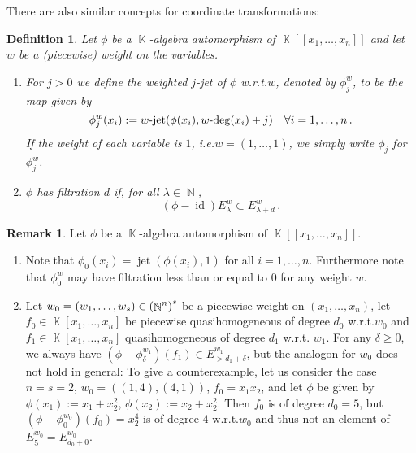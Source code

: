 \documentclass{amsproc}
\newtheorem{defn}[theorem]{Definition}
\theoremstyle{definition}
\newtheorem{remark}[theorem]{Remark}
\let\originalleft\left
\let\originalright\right
\renewcommand{\left}{\mathopen{}\mathclose\bgroup\originalleft}
\renewcommand{\right}{\aftergroup\egroup\originalright}
\DeclareMathOperator{\jet}{jet}
\DeclareMathOperator{\N}{\mathbb{N}}
\DeclareMathOperator{\K}{\mathbb{K}}
\DeclareMathOperator{\id}{id}
\DeclareMathOperator{\dash}{\!\textnormal{-}\!}
\begin{document}
There are also similar concepts for coordinate transformations:

\begin{defn}\label{def:jet_phi}
Let $\phi$ be a $\K$-algebra automorphism of $\K[[x_1,\ldots,x_n]]$ and let
$w$ be a (piecewise) weight on the variables.

\begin{enumerate}
\item
For $j > 0$ we define the weighted $j$-jet of $\phi$ w.r.t.\@ $w$, denoted by
$\phi_j^w$, to be the map given by
\[
\phi_j^w(x_i) := w\dash\jet(\phi(x_i),w\dash\deg(x_i)+j) \quad
\forall i = 1,\ldots,n \,.
\]
If the weight of each variable is $1$, i.e.\@ $w = (1, \ldots, 1)$, we simply
write $\phi_j$ for $\phi_j^w$.

\item\label{enum:filtration}
$\phi$ has filtration $d$ if, for all $\lambda \in \N$,
\[
(\phi-\id)E_\lambda^w \subset E_{\lambda+d}^w \,.
\]
\end{enumerate}
\end{defn}

\begin{remark}\label{rem:weighted_jet}
Let $\phi$ be a $\K$-algebra automorphism of $\K[[x_1,\ldots,x_n]]$.

\begin{enumerate}
\item
Note that $\phi_0(x_i) = \jet(\phi(x_i), 1)$ for all $i = 1, \ldots, n$.
Furthermore note that $\phi_0^w$ may have filtration less than or equal to $0$
for any weight $w$.

\item\label{enum:weighted_jet}
Let $w_0 = (w_1, \ldots, w_s) \in \left(\N^n\right)^s$ be a piecewise weight on
$(x_1, \ldots, x_n)$, let $f_0 \in \K[x_1,\ldots,x_n]$ be piecewise
quasihomogeneous of degree $d_0$ w.r.t.\@ $w_0$ and
$f_1 \in \K[x_1,\ldots,x_n]$ quasihomogeneous of degree $d_1$ w.r.t.\@
$w_1$. For any $\delta \geq 0$, we always have
$(\phi-\phi_\delta^{w_1})(f_1) \in E_{>d_1+\delta}^{w_1}$, but the analogon for
$w_0$ does not hold in general: To give a counterexample, let us consider the
case $n = s = 2$, $w_0 = ((1,4), (4,1))$, $f_0 = x_1 x_2$, and let $\phi$ be
given by $\phi(x_1) := x_1+x_2^2$, $\phi(x_2) := x_2+x_2^2$. Then $f_0$ is of
degree $d_0 = 5$, but $(\phi-\phi_0^{w_0})(f_0) = x_2^4$ is of degree $4$
w.r.t.\@ $w_0$ and thus not an element of $E_5^{w_0} = E_{d_0+0}^{w_0}$.
\end{enumerate}
\end{remark}
\end{document}
